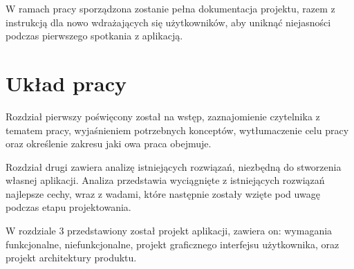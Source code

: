 W ramach pracy sporządzona zostanie pełna dokumentacja projektu, razem z instrukcją dla nowo wdrażających się użytkowników, aby uniknąć niejasności podczas pierwszego spotkania z aplikacją. 


\section{Układ pracy}
Rozdział pierwszy poświęcony został na wstęp, zaznajomienie czytelnika z tematem pracy, wyjaśnieniem potrzebnych konceptów, wytłumaczenie celu pracy oraz określenie zakresu jaki owa praca obejmuje. 

Rozdział drugi zawiera analizę istniejących rozwiązań, niezbędną do stworzenia własnej aplikacji. Analiza przedstawia wyciągnięte z istniejących rozwiązań najlepsze cechy, wraz z wadami, które następnie zostały wzięte pod uwagę podczas etapu projektowania.

W rozdziale 3 przedstawiony został projekt aplikacji, zawiera on: wymagania funkcjonalne, niefunkcjonalne, projekt graficznego interfejsu użytkownika, oraz projekt architektury produktu.

